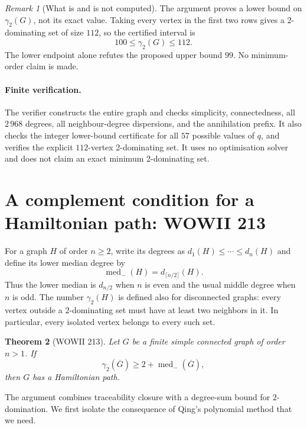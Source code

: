 \documentclass[11pt,a4paper]{article}
\newtheorem{theorem}{Theorem}[section]
\theoremstyle{remark}
\newtheorem{remark}[theorem]{Remark}
\begin{document}
\begin{remark}[What is and is not computed]\label{r5:400cvalue}
The argument proves a lower bound on \(\gamma_2(G)\), not its exact
value. Taking every vertex in the first two rows gives a
2-dominating set of size \(112\), so the certified interval is
\[
100\le\gamma_2(G)\le112.
\]
The lower endpoint alone refutes the proposed upper bound \(99\).
No minimum-order claim is made.
\end{remark}

\paragraph{Finite verification.}
The verifier constructs the entire graph and checks simplicity,
connectedness, all \(2\,968\) degrees, all neighbour-degree
dispersions, and the annihilation prefix. It also checks the
integer lower-bound certificate for all \(57\) possible values
of \(q\), and verifies the explicit \(112\)-vertex 2-dominating
set. It uses no optimisation solver and does not claim an exact
minimum 2-dominating set.


\section{A complement condition for a Hamiltonian path: WOWII 213}
\label{r6h:sec213}

For a graph $H$ of order $n\ge2$, write its degrees as
$d_1(H)\le\cdots\le d_n(H)$ and define its lower median degree by
\[
 \operatorname{med}_{-}(H)=d_{\lceil n/2\rceil}(H).
\]
Thus the lower median is $d_{n/2}$ when $n$ is even and the usual
middle degree when $n$ is odd.  The number $\gamma_2(H)$ is defined
also for disconnected graphs: every vertex outside a $2$-dominating
set must have at least two neighbors in it.  In particular, every
isolated vertex belongs to every such set.

\begin{theorem}[WOWII 213]
\label{r6h:thm213}
Let $G$ be a finite simple connected graph of order $n>1$.
If
\begin{equation}
 \label{r6h:213hyp}
 \gamma_2(\overline G)\ge
 2+\operatorname{med}_{-}(\overline G),
\end{equation}
then $G$ has a Hamiltonian path.
\end{theorem}

The argument combines traceability closure with a degree-sum bound
for $2$-domination.  We first isolate the consequence of Qing's
polynomial method that we need.
\end{document}
